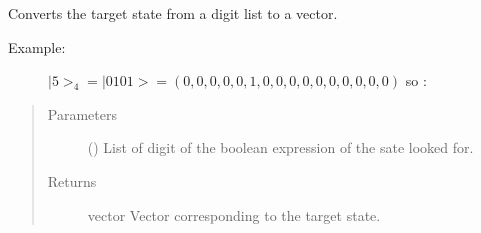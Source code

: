 \documentclass[letterpaper,10pt,english]{sphinxmanual}
\begin{document}
\begin{fulllineitems}
\label{\detokenize{grover:grover.target_state_ket_list_to_vector}}
Converts the target state from a digit list to a vector.
\begin{description}
\item[{Example:}] \leavevmode
\(|5>_4 = |0101> = (0, 0, 0, 0, 0, 1, 0, 0, 0, 0, 0, 0, 0, 0, 0, 0)\) so :

%
\begin{sphinxVerbatim}[commandchars=\\\{\},formatcom=\footnotesize]
\PYG{p}{[}\PYG{p}{]}
\end{sphinxVerbatim}

\end{description}
\begin{quote}\begin{description}
\item[{Parameters}] \leavevmode
{} (\sphinxstyleliteralemphasis{\sphinxupquote{{[}}}\sphinxstyleliteralemphasis{\sphinxupquote{{]}}}) \textendash{} List of digit of the boolean expression of 
the sate looked for.

\item[{Returns}] \leavevmode
vector \textendash{} Vector corresponding to the target state.

\end{description}\end{quote}

\end{fulllineitems}

\end{document}
